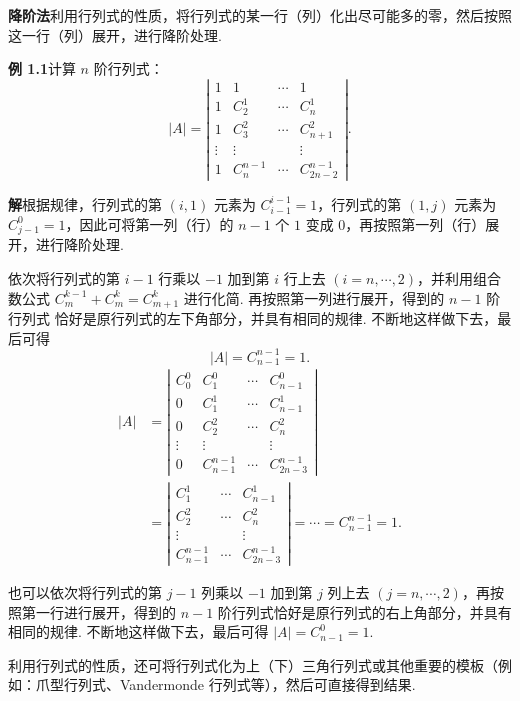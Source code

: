 \documentclass[UTF8, 12pt, fontset=fandol, oneside]{ctexart}
\begin{document}
\noindent\textbf{降阶法}\quad 利用行列式的性质，将行列式的某一行（列）化出尽可能多的零，然后按照这一行（列）展开，进行降阶处理.

\noindent\textbf{例 1.1}\quad 计算 $n$ 阶行列式：
\[
|A|=\left|\begin{array}{cccc}
1 & 1 & \cdots & 1\\
1 & C_2^1 & \cdots & C_n^1\\
1 & C_3^2 & \cdots & C_{n+1}^2\\
\vdots & \vdots &        & \vdots\\
1 & C_n^{n-1} & \cdots & C_{2n-2}^{n-1}
\end{array}\right|.
\]

\noindent\textbf{解}\quad 根据规律，行列式的第 $(i,1)$ 元素为 $C_{i-1}^{i-1}=1$，行列式的第 $(1,j)$ 元素为 $C_{j-1}^0=1$，因此可将第一列（行）的 $n-1$ 个 $1$ 变成 $0$，再按照第一列（行）展开，进行降阶处理.

依次将行列式的第 $i-1$ 行乘以 $-1$ 加到第 $i$ 行上去 $(i=n,\cdots,2)$，并利用组合数公式 $C_m^{k-1}+C_m^k=C_{m+1}^k$ 进行化简. 再按照第一列进行展开，得到的 $n-1$ 阶行列式
恰好是原行列式的左下角部分，并具有相同的规律. 不断地这样做下去，最后可得
\[
|A|=C_{n-1}^{n-1}=1.
\]
\[
\begin{aligned}
|A|
&=
\left|\begin{array}{cccc}
C_0^0 & C_1^0 & \cdots & C_{n-1}^0\\
0 & C_1^1 & \cdots & C_{n-1}^1\\
0 & C_2^2 & \cdots & C_n^2\\
\vdots & \vdots &        & \vdots\\
0 & C_{n-1}^{n-1} & \cdots & C_{2n-3}^{n-1}
\end{array}\right|\\
&=
\left|\begin{array}{ccc}
C_1^1 & \cdots & C_{n-1}^1\\
C_2^2 & \cdots & C_n^2\\
\vdots &        & \vdots\\
C_{n-1}^{n-1} & \cdots & C_{2n-3}^{n-1}
\end{array}\right|
=\cdots=C_{n-1}^{n-1}=1.
\end{aligned}
\]

也可以依次将行列式的第 $j-1$ 列乘以 $-1$ 加到第 $j$ 列上去 $(j=n,\cdots,2)$，再按照第一行进行展开，得到的 $n-1$ 阶行列式恰好是原行列式的右上角部分，并具有相同的规律. 不断地这样做下去，最后可得 $|A|=C_{n-1}^0=1$.

利用行列式的性质，还可将行列式化为上（下）三角行列式或其他重要的模板（例如：爪型行列式、Vandermonde 行列式等），然后可直接得到结果.
\end{document}
